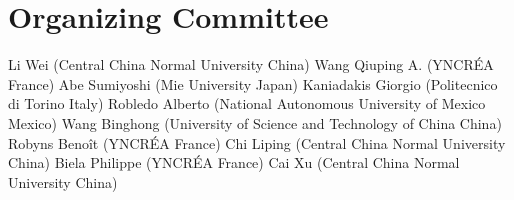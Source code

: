 \documentclass[oneside,A4paper,12pt]{article}
\begin{document}
\section*{Organizing Committee}
\label{sec:orgacfca9c}

\begin{flushleft}
 Li          Wei (Central China Normal University                    China)  \newline
 Wang        Qiuping A. (YNCRÉA                                      France) \newline
 Abe         Sumiyoshi (Mie University                               Japan)  \newline
 Kaniadakis  Giorgio (Politecnico di Torino                          Italy)  \newline
 Robledo     Alberto (National Autonomous University of Mexico       Mexico) \newline
 Wang        Binghong (University of Science and Technology of China China)  \newline
 Robyns      Benoît (YNCRÉA                                          France) \newline
 Chi         Liping (Central China Normal University                 China)  \newline
 Biela       Philippe (YNCRÉA                                        France) \newline
 Cai         Xu (Central China Normal University                      China) \newline
\end{flushleft}


\newpage
\end{document}
